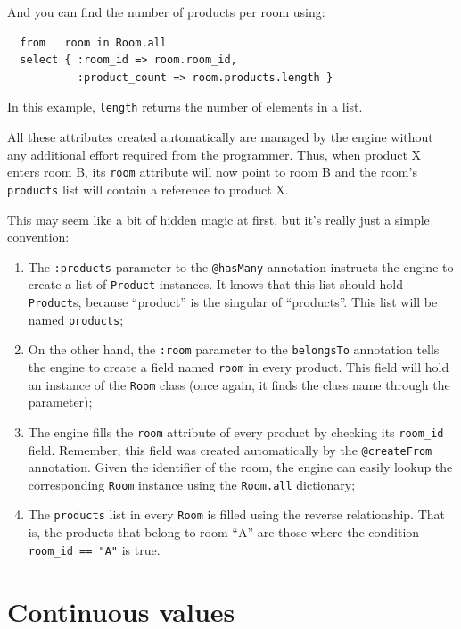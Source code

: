\documentclass{report}
\begin{document}
And you can find the number of products per room using:

\begin{lstlisting}
  from   room in Room.all
  select { :room_id => room.room_id,
           :product_count => room.products.length }
\end{lstlisting}

In this example, \verb=length= returns the number of elements in a
list.

All these attributes created automatically are managed by the engine
without any additional effort required from the programmer. Thus, when
product X enters room B, its \verb=room= attribute will now point to
room B and the room's \verb=products= list will contain a reference to
product X.

This may seem like a bit of hidden magic at first, but it's really
just a simple convention:

\begin{enumerate}
\item The \verb=:products= parameter to the \verb=@hasMany= annotation
  instructs the engine to create a list of \verb=Product=
  instances. It knows that this list should hold \verb=Product=s,
  because ``product'' is the singular of ``products''. This list will
  be named \verb=products=;
\item On the other hand, the \verb=:room= parameter to the
  \verb=belongsTo= annotation tells the engine to create a field named
  \verb=room= in every product. This field will hold an instance of the
  \verb=Room= class (once again, it finds the class name through the
  parameter);
\item The engine fills the \verb=room= attribute of every product by
  checking its \verb=room_id= field. Remember, this field was created
  automatically by the \verb=@createFrom= annotation. Given the
  identifier of the room, the engine can easily lookup the
  corresponding \verb=Room= instance using the \verb=Room.all=
  dictionary;
\item The \verb=products= list in every \verb=Room= is filled using
  the reverse relationship. That is, the products that belong to room
  ``A'' are those where the condition \verb!room_id == "A"! is true.
\end{enumerate}

\section{Continuous values}
\label{sec:continuous-values}
\end{document}
